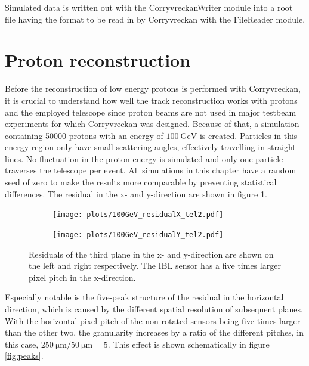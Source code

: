 Simulated data is written out with the CorryvreckanWriter module into a root file having the format to be read
in by Corryvreckan with the FileReader module.

\section{Proton reconstruction}\label{sec:proton_reconstruction}
Before the reconstruction of low energy protons is performed with Corryvreckan, it is crucial to understand how well the
track reconstruction works with protons and the employed telescope since proton beams are not used in major testbeam
experiments for which Corryvreckan was designed. Because of that, a simulation containing 50000 protons
with an energy of $\SI{100}{\giga\eV}$ is created.
Particles in this energy region only have small scattering angles, effectively travelling
in straight lines.
No fluctuation in the proton energy is simulated and only one particle traverses
the telescope per event. All simulations in this chapter have a random seed of zero to make the results more comparable by preventing
statistical differences.
The residual in the x- and y-direction are shown in figure \ref{fig:100GeV}.

\begin{figure}
  \hspace{-2.5cm}
  \begin{subfigure}{0.62\textwidth}
      \centering
      \texttt{[image: plots/100GeV\_residualX\_tel2.pdf]}
  \end{subfigure}
  \begin{subfigure}{0.62\textwidth}
      \hspace{0.95cm}
      \texttt{[image: plots/100GeV\_residualY\_tel2.pdf]}
  \end{subfigure}
  \caption{Residuals of the third plane in the x- and y-direction are shown on the left and right respectively.
  The IBL sensor has a five times larger pixel pitch in the x-direction. }
  \label{fig:100GeV}
\end{figure}

Especially notable is the five-peak structure of the residual in the horizontal direction, which is caused by the different
spatial resolution of subsequent planes. With the horizontal pixel pitch of the non-rotated sensors being
five times larger than the other two, the granularity increases by a ratio of the different pitches, in this case,
$\SI{250}{\micro\meter}/\SI{50}{\micro\meter} = 5$. This effect is shown schematically in figure \ref{fig:peaks}.

